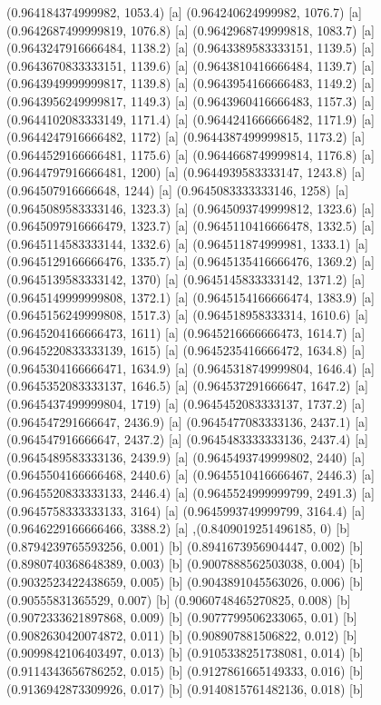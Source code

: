{{{(0.964184374999982, 1053.4) [a] 
(0.964240624999982, 1076.7) [a] 
(0.9642687499999819, 1076.8) [a] 
(0.9642968749999818, 1083.7) [a] 
(0.9643247916666484, 1138.2) [a] 
(0.9643389583333151, 1139.5) [a] 
(0.9643670833333151, 1139.6) [a] 
(0.9643810416666484, 1139.7) [a] 
(0.9643949999999817, 1139.8) [a] 
(0.9643954166666483, 1149.2) [a] 
(0.9643956249999817, 1149.3) [a] 
(0.9643960416666483, 1157.3) [a] 
(0.9644102083333149, 1171.4) [a] 
(0.9644241666666482, 1171.9) [a] 
(0.9644247916666482, 1172) [a] 
(0.9644387499999815, 1173.2) [a] 
(0.9644529166666481, 1175.6) [a] 
(0.9644668749999814, 1176.8) [a] 
(0.9644797916666481, 1200) [a] 
(0.9644939583333147, 1243.8) [a] 
(0.964507916666648, 1244) [a] 
(0.9645083333333146, 1258) [a] 
(0.9645089583333146, 1323.3) [a] 
(0.9645093749999812, 1323.6) [a] 
(0.9645097916666479, 1323.7) [a] 
(0.9645110416666478, 1332.5) [a] 
(0.9645114583333144, 1332.6) [a] 
(0.964511874999981, 1333.1) [a] 
(0.9645129166666476, 1335.7) [a] 
(0.9645135416666476, 1369.2) [a] 
(0.9645139583333142, 1370) [a] 
(0.9645145833333142, 1371.2) [a] 
(0.9645149999999808, 1372.1) [a] 
(0.9645154166666474, 1383.9) [a] 
(0.9645156249999808, 1517.3) [a] 
(0.964518958333314, 1610.6) [a] 
(0.9645204166666473, 1611) [a] 
(0.9645216666666473, 1614.7) [a] 
(0.9645220833333139, 1615) [a] 
(0.9645235416666472, 1634.8) [a] 
(0.9645304166666471, 1634.9) [a] 
(0.9645318749999804, 1646.4) [a] 
(0.9645352083333137, 1646.5) [a] 
(0.964537291666647, 1647.2) [a] 
(0.9645437499999804, 1719) [a] 
(0.9645452083333137, 1737.2) [a] 
(0.964547291666647, 2436.9) [a] 
(0.9645477083333136, 2437.1) [a] 
(0.964547916666647, 2437.2) [a] 
(0.9645483333333136, 2437.4) [a] 
(0.9645489583333136, 2439.9) [a] 
(0.9645493749999802, 2440) [a] 
(0.9645504166666468, 2440.6) [a] 
(0.9645510416666467, 2446.3) [a] 
(0.9645520833333133, 2446.4) [a] 
(0.9645524999999799, 2491.3) [a] 
(0.9645758333333133, 3164) [a] 
(0.9645993749999799, 3164.4) [a] 
(0.9646229166666466, 3388.2) [a] 
},{(0.8409019251496185, 0) [b] 
(0.8794239765593256, 0.001) [b] 
(0.8941673956904447, 0.002) [b] 
(0.8980740368648389, 0.003) [b] 
(0.9007888562503038, 0.004) [b] 
(0.9032523422438659, 0.005) [b] 
(0.9043891045563026, 0.006) [b] 
(0.90555831365529, 0.007) [b] 
(0.9060748465270825, 0.008) [b] 
(0.9072333621897868, 0.009) [b] 
(0.9077799506233065, 0.01) [b] 
(0.9082630420074872, 0.011) [b] 
(0.908907881506822, 0.012) [b] 
(0.9099842106403497, 0.013) [b] 
(0.9105338251738081, 0.014) [b] 
(0.9114343656786252, 0.015) [b] 
(0.9127861665149333, 0.016) [b] 
(0.9136942873309926, 0.017) [b] 
(0.9140815761482136, 0.018) [b] 
}}}
